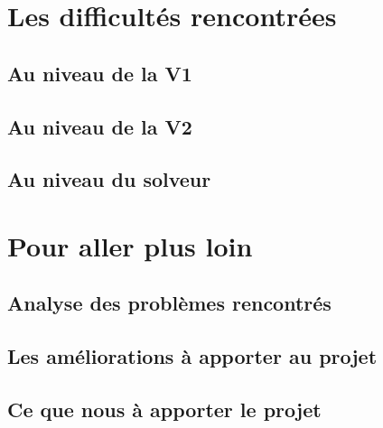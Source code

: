 \documentclass{report}
\begin{document}
\chapter{Les difficultés rencontrées}
\setcounter{section}{0}
\section{Au niveau de la V1}

\section{Au niveau de la V2}

\section{Au niveau du solveur}



\chapter{Pour aller plus loin}
\setcounter{section}{0}
\section{Analyse des problèmes rencontrés}


\section{Les améliorations à apporter au projet}

\section{Ce que nous à apporter le projet}
\end{document}
